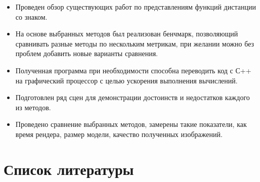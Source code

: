 \documentclass[a4paper,hidelinks,12pt]{article}
\begin{document}
\begin{itemize}
	\item Проведен обзор существующих работ по представлениям функций дистанции со знаком.
	\item На основе выбранных методов был реализован бенчмарк, позволяющий сравнивать разные методы по нескольким метрикам, при желании можно без проблем добавить новые варианты сравнения.
	\item Полученная программа при необходимости способна переводить код с С++ на графический процессор с целью ускорения выполнения вычислений.
	\item Подготовлен ряд сцен для демонстрации достоинств и недостатков каждого из методов.
	\item Проведено сравнение выбранных методов, замерены такие показатели, как время рендера, размер модели, качество полученных изображений. 
\end{itemize}

\newpage

\section{Список литературы}
\end{document}
